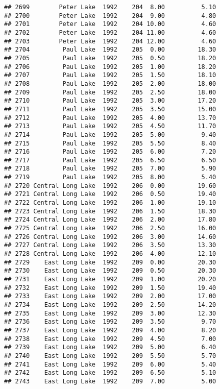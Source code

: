 \documentclass[
]{article}
\begin{document}
\begin{verbatim}
## 2699        Peter Lake  1992    204  8.00          5.10
## 2700        Peter Lake  1992    204  9.00          4.80
## 2701        Peter Lake  1992    204 10.00          4.60
## 2702        Peter Lake  1992    204 11.00          4.60
## 2703        Peter Lake  1992    204 12.00          4.60
## 2704         Paul Lake  1992    205  0.00         18.30
## 2705         Paul Lake  1992    205  0.50         18.20
## 2706         Paul Lake  1992    205  1.00         18.20
## 2707         Paul Lake  1992    205  1.50         18.10
## 2708         Paul Lake  1992    205  2.00         18.00
## 2709         Paul Lake  1992    205  2.50         18.00
## 2710         Paul Lake  1992    205  3.00         17.20
## 2711         Paul Lake  1992    205  3.50         15.00
## 2712         Paul Lake  1992    205  4.00         13.70
## 2713         Paul Lake  1992    205  4.50         11.70
## 2714         Paul Lake  1992    205  5.00          9.40
## 2715         Paul Lake  1992    205  5.50          8.40
## 2716         Paul Lake  1992    205  6.00          7.20
## 2717         Paul Lake  1992    205  6.50          6.50
## 2718         Paul Lake  1992    205  7.00          5.90
## 2719         Paul Lake  1992    205  8.00          5.40
## 2720 Central Long Lake  1992    206  0.00         19.60
## 2721 Central Long Lake  1992    206  0.50         19.40
## 2722 Central Long Lake  1992    206  1.00         19.10
## 2723 Central Long Lake  1992    206  1.50         18.30
## 2724 Central Long Lake  1992    206  2.00         17.80
## 2725 Central Long Lake  1992    206  2.50         16.00
## 2726 Central Long Lake  1992    206  3.00         14.60
## 2727 Central Long Lake  1992    206  3.50         13.30
## 2728 Central Long Lake  1992    206  4.00         12.10
## 2729    East Long Lake  1992    209  0.00         20.30
## 2730    East Long Lake  1992    209  0.50         20.30
## 2731    East Long Lake  1992    209  1.00         20.20
## 2732    East Long Lake  1992    209  1.50         19.40
## 2733    East Long Lake  1992    209  2.00         17.00
## 2734    East Long Lake  1992    209  2.50         14.20
## 2735    East Long Lake  1992    209  3.00         12.30
## 2736    East Long Lake  1992    209  3.50          9.70
## 2737    East Long Lake  1992    209  4.00          8.20
## 2738    East Long Lake  1992    209  4.50          7.00
## 2739    East Long Lake  1992    209  5.00          6.40
## 2740    East Long Lake  1992    209  5.50          5.70
## 2741    East Long Lake  1992    209  6.00          5.40
## 2742    East Long Lake  1992    209  6.50          5.10
## 2743    East Long Lake  1992    209  7.00          5.00

\end{verbatim}
\end{document}

